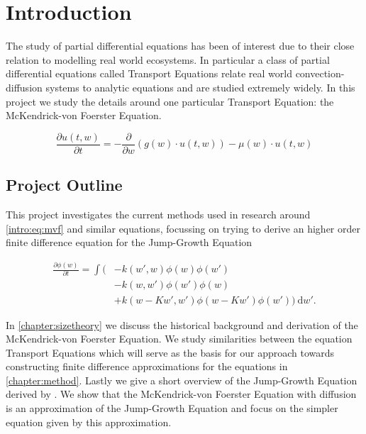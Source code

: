 \documentclass[../main]{subfiles}
\begin{document}

  \setlength{\parskip}{0em}
  \setcounter{page}{3}
  \tableofcontents
  \listoffigures

  \chapter{Introduction}\label{chapter:introduction}

  The study of partial differential equations has been of interest due to their close relation to modelling real world ecosystems. In particular a class of partial differential equations called Transport Equations relate real world convection-diffusion systems to analytic equations and are studied extremely widely. In this project we study the details around one particular Transport Equation: the McKendrick-von Foerster Equation.

  \begin{equation} \label{intro:eq:mvf}
    \frac{\partial u(t, w)}{\partial t} = - \frac{\partial}{\partial w} \left(g(w) \cdot u(t, w) \right) - \mu(w) \cdot u(t, w)
  \end{equation}

  \section*{Project Outline}
  This project investigates the current methods used in research around \autoref{intro:eq:mvf} and similar equations, focussing on trying to derive an higher order finite difference equation for the Jump-Growth Equation

  \begin{align}\label{intro:eq:jumpgrowth}
    \frac{\partial \phi(w)}{\partial t}
    = \int ( &- k(w', w) \phi(w)\phi(w') \nonumber \\
    & - k(w, w')\phi(w')\phi(w) \nonumber \\
    & + k(w - Kw', w')\phi(w - Kw')\phi(w')) \: \mathrm{d}w'.
  \end{align}

  In \autoref{chapter:sizetheory} we discuss the historical background and derivation of the McKendrick-von Foerster Equation. We study similarities between the equation Transport Equations which will serve as the basis for our approach towards constructing finite difference approximations for the equations in \autoref{chapter:method}. Lastly we give a short overview of the Jump-Growth Equation derived by \cite{datta2010}. We show that the McKendrick-von Foerster Equation with diffusion is an approximation of the Jump-Growth Equation and focus on the simpler equation given by this approximation.
\end{document}
